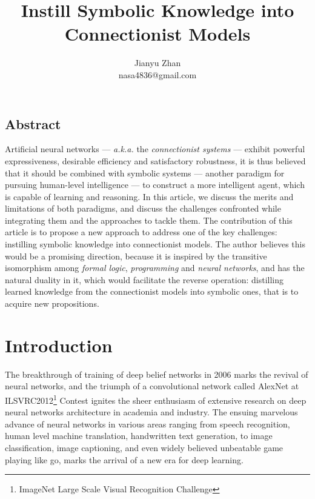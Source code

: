 \documentclass[letterpaper,10pt]{article}
\theoremstyle{definition}
\begin{document}
\date{}

\title{\Large \bf Instill Symbolic Knowledge into Connectionist Models}

\author{
{\rm Jianyu Zhan}\\
nasa4836@gmail.com
}

\maketitle

\thispagestyle{empty}


\subsection*{Abstract}

Artificial neural networks ---  \emph{a.k.a.} the \emph{connectionist systems} --- exhibit 
powerful expressiveness,  desirable efficiency and satisfactory robustness, it is thus
believed that it should be combined with symbolic systems --- another paradigm for pursuing
human-level intelligence --- to construct a more intelligent agent, which is capable of learning and
reasoning. In this article, we discuss the merits and limitations of both
paradigms, and discuss the challenges confronted while integrating them and the approaches
to tackle them. The contribution of this article is to propose a new approach to address one of
the key challenges: instilling symbolic knowledge into connectionist models. The author believes
this would be a promising direction, because it is inspired by the transitive isomorphism among
\emph{formal logic}, \emph{programming} and \emph{neural networks}, and has the natural duality
in it, which would facilitate the reverse operation: distilling learned knowledge from the connectionist
models into symbolic ones, that is to acquire new propositions.

\section{Introduction}\label{intro_sec}

The breakthrough of training of deep belief networks\cite{hinton2006fast,
bengio2007greedy} in 2006 marks the revival of neural networks, and the
triumph of a convolutional network called AlexNet\cite{Krizhevsky2012}
at ILSVRC2012\footnote{ImageNet Large Scale Visual Recognition Challenge}
Contest ignites the sheer enthusiasm of extensive research on deep neural
networks architecture in academia and industry. The ensuing marvelous advance
of neural networks in various areas ranging from speech recognition, human
level machine translation, handwritten text generation, to image classification,
image captioning, and even widely believed unbeatable game playing like go, marks
the arrival of a new era for deep learning. 
\end{document}
